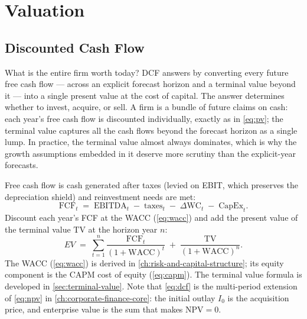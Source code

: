 \chapter{Valuation}\label{ch:valuation}


\section{Discounted Cash Flow}\label{sec:dcf}

What is the entire firm worth today? DCF answers by converting every future free cash flow
--- across an explicit forecast horizon and a terminal value beyond it --- into a single
present value at the cost of capital. The answer determines whether to invest, acquire, or
sell. A firm is a bundle of future claims on cash: each year's free cash flow is discounted
individually, exactly as in \cref{eq:pv}; the terminal value captures all the cash flows
beyond the forecast horizon as a single lump. In practice, the terminal value almost always
dominates, which is why the growth assumptions embedded in it deserve more scrutiny than the
explicit-year forecasts.

Free cash flow is cash generated after taxes (levied on EBIT, which preserves the depreciation shield) and reinvestment needs are met:
\[
  \mathrm{FCF}_t \;=\; \mathrm{EBITDA}_t \;-\; \text{taxes}_t
                       \;-\; \Delta\mathrm{WC}_t \;-\; \mathrm{CapEx}_t.
\]
Discount each year's FCF at the WACC (\cref{eq:wacc}) and add the present value of the
terminal value \(\mathrm{TV}\) at the horizon year \(n\):
\begin{equation}\label{eq:dcf}
  EV \;=\; \sum_{t=1}^{n}\frac{\mathrm{FCF}_t}{(1+\mathrm{WACC})^{t}}
           \;+\; \frac{\mathrm{TV}}{(1+\mathrm{WACC})^{n}}.
\end{equation}
The WACC (\cref{eq:wacc}) is derived in \cref{ch:risk-and-capital-structure}; its equity
component is the CAPM cost of equity (\cref{eq:capm}). The terminal value formula is
developed in \cref{sec:terminal-value}. Note that \cref{eq:dcf} is the multi-period
extension of \cref{eq:npv} in \cref{ch:corporate-finance-core}: the initial outlay \(I_0\)
is the acquisition price, and enterprise value is the sum that makes \(\mathrm{NPV}=0\).


